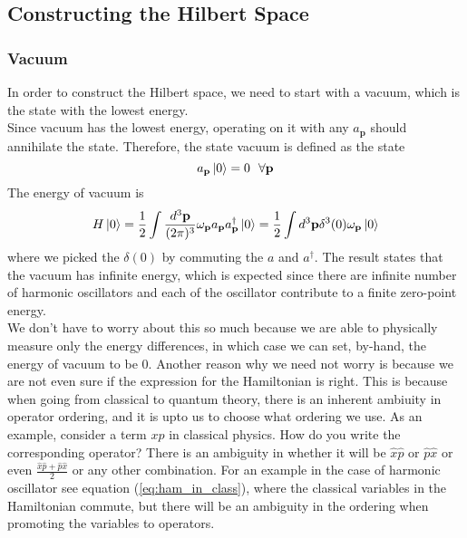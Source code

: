 \documentclass[11pt, notitlepage]{report}
\newcommand{\w}{\omega}
\numberwithin{equation}{section}
\begin{document}
    \subsection{Constructing the Hilbert Space}
    \subsubsection{Vacuum}
    In order to construct the Hilbert space, we need to start with a vacuum, which is the state with the lowest energy. \\
    Since vacuum has the lowest energy, operating on it with any \(a_\textbf{p}\) should annihilate the state. Therefore, the state vacuum is defined as the state 
    \begin{equation*}
        a_\textbf{p}\ket{0} = 0 ~~\forall \textbf{p}
    \end{equation*}
    The energy of vacuum is 
    \begin{equation*}
        H\ket{0} = \frac{1}{2}\int \frac{d^3\textbf{p}}{(2\pi)^3}\w_\textbf{p} a_\textbf{p} a^\dagger_\textbf{p}\ket{0} =  \frac{1}{2}\int  d^3\textbf{p} \delta^3(0) \w_\textbf{p} \ket{0}
    \end{equation*}
    where we picked the \(\delta(0)\) by commuting the \(a\) and \(a^\dagger\). The result states that the vacuum has infinite energy, which is expected since there are infinite number of harmonic oscillators and each of the oscillator contribute to a finite zero-point energy.\\

    We don't have to worry about this so much because we are able to physically measure only the energy differences, in which case we can set, by-hand, the energy of vacuum to be 0. Another reason why we need not worry is because we are not even sure if the expression for the Hamiltonian is right. This is because when going from classical to quantum theory, there is an inherent ambiuity in operator ordering, and it is upto us to choose what ordering we use. 
    As an example, consider a term \(xp\) in classical physics. How do you write the corresponding operator? There is an ambiguity in whether it will be \(\hat x \hat p\) or \(\hat p \hat x\) or even \(\displaystyle\frac{\hat x \hat p + \hat p \hat x}{2}\) or any other combination. For an example in the case of harmonic oscillator see equation (\ref{eq:ham_in_class}), where the classical variables in the Hamiltonian commute, but there will be an ambiguity in the ordering when promoting the variables to operators. \\
\end{document}
